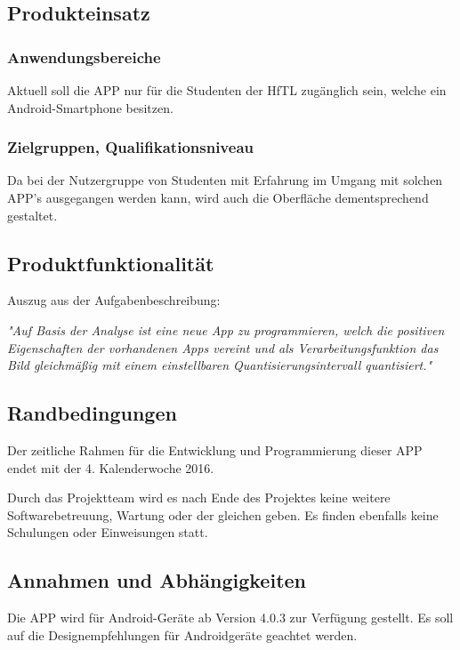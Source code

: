 \subsection{\textbf{Produkteinsatz}}

\subsubsection{Anwendungsbereiche}
Aktuell soll die APP nur für die Studenten der \acs{HfTL} zugänglich sein, welche ein Android-Smartphone besitzen. 

\subsubsection{Zielgruppen, Qualifikationsniveau}

Da bei der Nutzergruppe von Studenten mit Erfahrung im Umgang mit solchen APP's ausgegangen werden kann, wird auch die Oberfläche dementsprechend gestaltet.

\subsection{\textbf{Produktfunktionalität}}

Auszug aus der Aufgabenbeschreibung:

\textit{"Auf Basis der Analyse ist eine neue App zu programmieren,
welch die positiven Eigenschaften der vorhandenen Apps vereint und als Verarbeitungsfunktion
das Bild gleichmäßig mit einem einstellbaren Quantisierungsintervall quantisiert."} 

\subsection{\textbf{Randbedingungen}}

Der zeitliche Rahmen für die Entwicklung und Programmierung dieser APP endet mit der 4. Kalenderwoche 2016.

Durch das Projektteam wird es nach Ende des Projektes keine weitere Softwarebetreuung, Wartung oder der gleichen geben. Es finden ebenfalls keine Schulungen oder Einweisungen statt.

\subsection{\textbf{Annahmen und Abhängigkeiten}}

Die APP wird für Android-Geräte ab Version 4.0.3 zur Verfügung gestellt. Es soll auf die Designempfehlungen für Androidgeräte geachtet werden.

